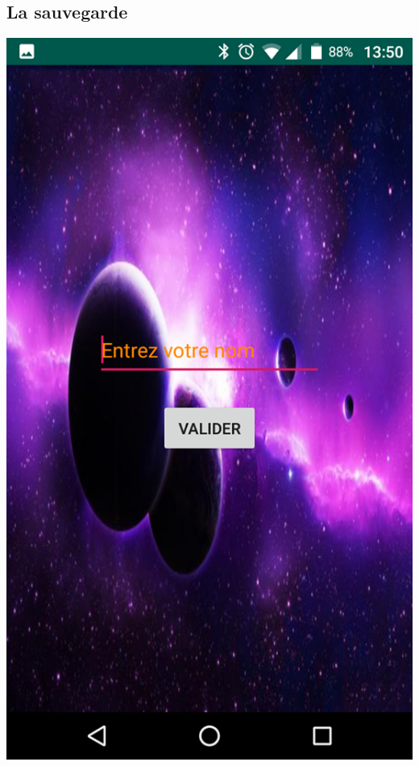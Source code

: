 \documentclass{article}
\begin{document}
\subsection{La sauvegarde}

\begin{minipage}[c]{.46\linewidth}
     \begin{center}
             \includegraphics[scale=0.2]{SaveScore.png}
         \end{center}
   \end{minipage} \hfill
\end{document}
